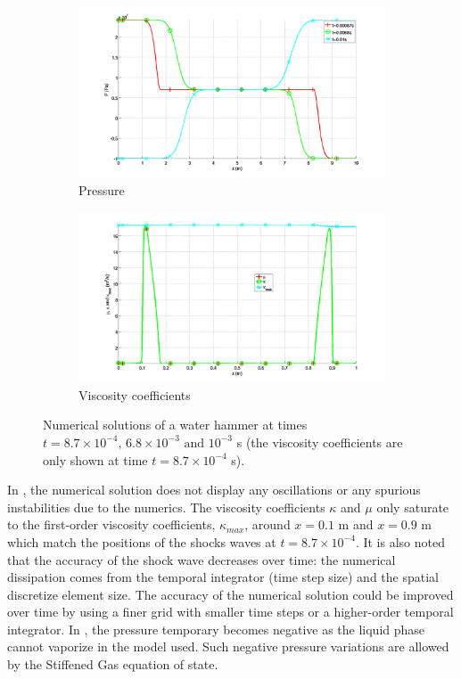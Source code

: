 \documentclass{mc2015}
\begin{document}
\begin{figure}[H]
        \begin{subfigure}[b]{0.495\textwidth}
                \centering
                \includegraphics[width=\textwidth]{figures/Plot_pressure_single_phase.png}
                \caption{Pressure}
                \label{fig:single-phase-press}
        \end{subfigure}        
        \begin{subfigure}[b]{0.495\textwidth}
                \centering
                \includegraphics[width=\textwidth]{figures/Plot_viscosity_single_phase.png}
                \caption{Viscosity coefficients}
                \label{fig:single-phase-visc}
        \end{subfigure}
        \caption{Numerical solutions of a water hammer at times $t=8.7 \times 10^{-4}, \, 6.8 \times 10^{-3} \text{ and } 10^{-3}$ s (the viscosity coefficients are only shown at time $t=8.7 \times 10^{-4}$ s).}\label{fig:single-phase}
\end{figure}
%
In , the numerical solution does not display any oscillations or any spurious instabilities due to the numerics. The viscosity coefficients $\kappa$ and $\mu$ only saturate to the first-order viscosity coefficients, $\kappa_{max}$, around $x=0.1$ m and $x=0.9$ m which match the positions of the shocks waves at $t=8.7 \times 10^{-4}$. It is also noted that the accuracy of the shock wave decreases over time: the numerical dissipation comes from the temporal integrator (time step size) and the spatial discretize element size. The accuracy of the numerical solution could be improved over time by using a finer grid with smaller time steps or a higher-order temporal integrator. In , the pressure temporary becomes negative as the liquid phase cannot vaporize in the model used. Such negative pressure variations are allowed by the Stiffened Gas equation of state.
\end{document}
